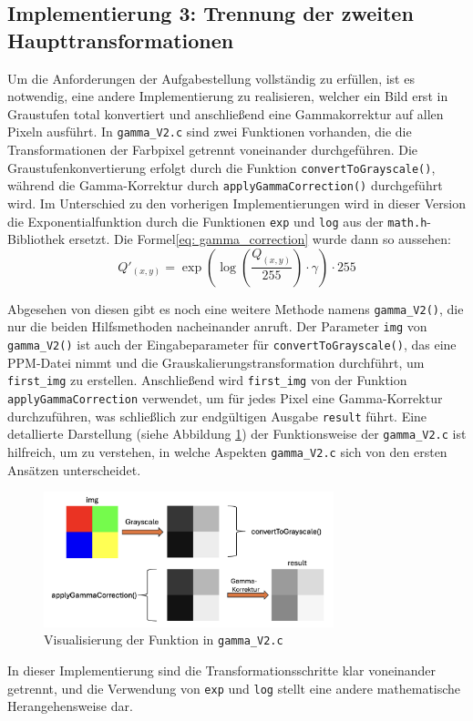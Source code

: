 \documentclass[course=erap]{aspdoc}
\begin{document}
\subsection{Implementierung 3: Trennung der zweiten Haupttransformationen}
Um die Anforderungen der Aufgabestellung vollständig zu erfüllen, ist es notwendig, eine andere Implementierung zu realisieren, welcher ein Bild erst in Graustufen total konvertiert und anschließend eine Gammakorrektur auf allen Pixeln ausführt.
In \texttt{gamma\_V2.c} sind zwei Funktionen vorhanden, die die Transformationen der Farbpixel getrennt voneinander durchgeführen. Die Graustufenkonvertierung erfolgt durch die Funktion \texttt{convertToGrayscale()}, während die Gamma-Korrektur durch \texttt{applyGammaCorrection()} durchgeführt wird. 
Im Unterschied zu den vorherigen Implementierungen wird in dieser Version die Exponentialfunktion durch die Funktionen \texttt{exp} und \texttt{log} aus der \texttt{math.h}-Bibliothek ersetzt. Die Formel\eqref{eq: gamma_correction} wurde dann so aussehen:\\
\begin{equation}
Q'_(x,y) = \exp\left(\log\left(\frac{Q_{(x,y)}}{255}\right) \cdot \gamma\right) \cdot 255 
\end{equation}

Abgesehen von diesen gibt es noch eine weitere Methode namens \texttt{gamma\_V2()}, die nur die beiden Hilfsmethoden nacheinander anruft.
Der Parameter \texttt{img} von \texttt{gamma\_V2()}  ist auch der Eingabeparameter für \texttt{convertToGrayscale()}, das eine PPM-Datei nimmt und die Grauskalierungstransformation durchführt, um \texttt{first\_img} zu erstellen. Anschließend wird \texttt{first\_img} von der Funktion \texttt{applyGammaCorrection} verwendet, um für jedes Pixel eine Gamma-Korrektur durchzuführen, was schließlich zur endgültigen Ausgabe \texttt{result} führt. Eine detallierte Darstellung (siehe Abbildung \ref{fig:5}) der Funktionsweise der \texttt{gamma\_V2.c} ist hilfreich, um zu verstehen, in welche Aspekten \texttt{gamma\_V2.c} sich von den ersten Ansätzen unterscheidet. 

\begin{figure}[h]
\centering
\includegraphics[width = 0.75\textwidth]{explanation_2.png}
\caption{Visualisierung der Funktion in \texttt{gamma\_V2.c}}
\label{fig:5}
\end{figure}
In dieser Implementierung sind die Transformationsschritte klar voneinander getrennt, und die Verwendung von \texttt{exp} und \texttt{log} stellt eine andere mathematische Herangehensweise dar. 
\end{document}
